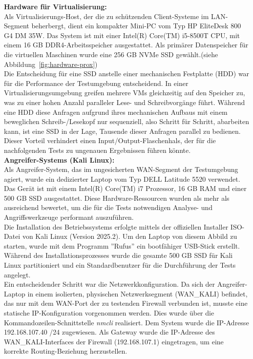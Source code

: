 \textbf{Hardware für Virtualisierung:}\\
Als Virtualisierungs-Host, der die zu schützenden Client-Systeme im LAN-Segment beherbergt, dient ein kompakter Mini-PC vom Typ HP EliteDesk 800 G4 DM 35W. Das System ist mit einer Intel(R) Core(TM) i5-8500T CPU, mit einem 16 GB DDR4-Arbeitsspeicher ausgestattet. Als primärer Datenspeicher für die virtuellen Maschinen wurde eine 256 GB NVMe SSD gewählt.(siehe Abbildung~\ref{fig:hardware-prox})\\

Die Entscheidung für eine SSD anstelle einer mechanischen Festplatte (HDD) war für die Performance der Testumgebung entscheidend. In einer Virtualisierungsumgebung greifen mehrere VMs gleichzeitig auf den Speicher zu, was zu einer hohen Anzahl paralleler Lese- und Schreibvorgänge führt. Während eine HDD diese Anfragen aufgrund ihres mechanischen Aufbaus mit einem beweglichen Schreib-/Lesekopf nur sequenziell, also Schritt für Schritt, abarbeiten kann, ist eine SSD in der Lage, Tausende dieser Anfragen parallel zu bedienen. Dieser Vorteil verhindert einen Input/Output-Flaschenhals, der für die nachfolgenden Tests zu ungenauen Ergebnissen führen könnte.\\

\textbf{Angreifer-Systems (Kali Linux):}\\
Als Angreifer-System, das im ungesicherten WAN-Segment der Testumgebung agiert, wurde ein dedizierter Laptop vom Typ DELL Latitude 5520 verwendet. Das Gerät ist mit einem Intel(R) Core(TM) i7 Prozessor, 16 GB RAM und einer 500 GB SSD ausgestattet. Diese Hardware-Ressourcen wurden als mehr als ausreichend bewertet, um die für die Tests notwendigen Analyse- und Angriffswerkzeuge performant auszuführen.\\

Die Installation des Betriebssystems erfolgte mittels der offiziellen Installer ISO-Datei von Kali Linux (Version 2025.2). Um den Laptop von diesem Abbild zu starten, wurde mit dem Programm ''Rufus'' ein bootfähiger USB-Stick erstellt. Während des Installationsprozesses wurde die gesamte 500 GB SSD für Kali Linux partitioniert und ein Standardbenutzer für die Durchführung der Tests angelegt.\\

Ein entscheidender Schritt war die Netzwerkkonfiguration. Da sich der Angreifer-Laptop in einem isolierten, physischen Netzwerksegment (WAN\_KALI) befindet, das nur mit dem WAN-Port der zu testenden Firewall verbunden ist, musste eine statische IP-Konfiguration vorgenommen werden. Dies wurde über die Kommandozeilen-Schnittstelle \textit{nmcli} realisiert. Dem System wurde die IP-Adresse 192.168.107.40 /24 zugewiesen. Als Gateway wurde die IP-Adresse des WAN\_KALI-Interfaces der Firewall (192.168.107.1) eingetragen, um eine korrekte Routing-Beziehung herzustellen.\\

